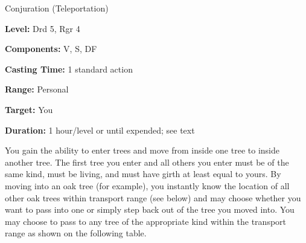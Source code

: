 
Conjuration (Teleportation)

\textbf{Level:} Drd 5, Rgr 4

\textbf{Components:} V, S, DF

\textbf{Casting Time:} 1 standard action

\textbf{Range:} Personal

\textbf{Target:} You

\textbf{Duration:} 1 hour/level or until expended; see text

You gain the ability to enter trees and move from inside one tree to inside another 
tree. The first tree you enter and all others you enter must be of the same kind, 
must be living, and must have girth at least equal to yours. By moving into an 
oak tree (for example), you instantly know the location of all other oak trees 
within transport range (see below) and may choose whether you want to pass into 
one or simply step back out of the tree you moved into. You may choose to pass 
to any tree of the appropriate kind within the transport range as shown on the 
following table.

